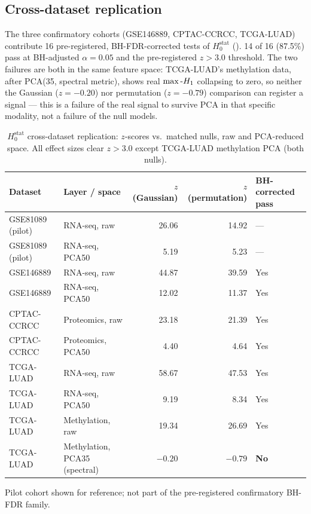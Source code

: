 \subsection{Cross-dataset replication}

The three confirmatory cohorts (GSE146889, CPTAC-CCRCC, TCGA-LUAD) contribute 16 pre-registered, BH-FDR-corrected tests of $H_0^{\text{stat}}$ (). 14 of 16 (87.5\%) pass at BH-adjusted $\alpha=0.05$ and the pre-registered $z>3.0$ threshold. The two failures are both in the same feature space: TCGA-LUAD's methylation data, after PCA(35, spectral metric), shows real $\max\text{-}H_1$ collapsing to zero, so neither the Gaussian ($z=-0.20$) nor permutation ($z=-0.79$) comparison can register a signal --- this is a failure of the real signal to survive PCA in that specific modality, not a failure of the null models.

\begin{table}[htbp]
\centering
\small
\caption{$H_0^{\text{stat}}$ cross-dataset replication: $z$-scores vs.\ matched nulls, raw and PCA-reduced space. All effect sizes clear $z>3.0$ except TCGA-LUAD methylation PCA (both nulls).}
\label{tab:h0-crossdataset}
\begin{tabular}{@{}llrrl@{}}
\toprule
Dataset & Layer / space & $z$ (Gaussian) & $z$ (permutation) & BH-corrected pass \\
\midrule
GSE81089 (pilot)\footnotemark[1] & RNA-seq, raw & 26.06 & 14.92 & --- \\
GSE81089 (pilot)\footnotemark[1] & RNA-seq, PCA50 & 5.19 & 5.23 & --- \\
GSE146889 & RNA-seq, raw & 44.87 & 39.59 & Yes \\
GSE146889 & RNA-seq, PCA50 & 12.02 & 11.37 & Yes \\
CPTAC-CCRCC & Proteomics, raw & 23.18 & 21.39 & Yes \\
CPTAC-CCRCC & Proteomics, PCA50 & 4.40 & 4.64 & Yes \\
TCGA-LUAD & RNA-seq, raw & 58.67 & 47.53 & Yes \\
TCGA-LUAD & RNA-seq, PCA50 & 9.19 & 8.34 & Yes \\
TCGA-LUAD & Methylation, raw & 19.34 & 26.69 & Yes \\
TCGA-LUAD & Methylation, PCA35 (spectral) & $-0.20$ & $-0.79$ & \textbf{No} \\
\bottomrule
\end{tabular}
\vspace{2pt}
\footnotesize{\footnotemark[1]Pilot cohort shown for reference; not part of the pre-registered confirmatory BH-FDR family.}
\end{table}


